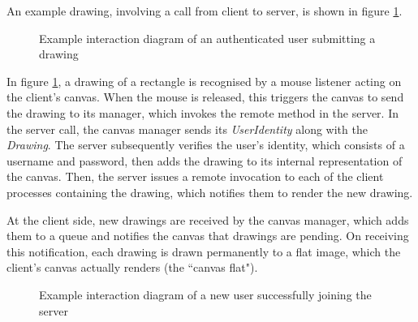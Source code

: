 \documentclass[12pt,a4paper]{article}
\begin{document}
An example drawing, involving a call from client to server, is shown in figure \ref{fig:draw}.

\begin{figure}[h]
\caption{Example interaction diagram of an authenticated user submitting a drawing}
\label{fig:draw}
\centering
\end{figure}

In figure \ref{fig:draw}, a drawing of a rectangle is recognised by a mouse listener acting on the client's canvas. When the mouse is released, this triggers the canvas to send the drawing to its manager, which invokes the remote method in the server. In the server call, the canvas manager sends its \textit{UserIdentity} along with the \textit{Drawing}. The server subsequently verifies the user's identity, which consists of a username and password, then adds the drawing to its internal representation of the canvas. Then, the server issues a remote invocation to each of the client processes containing the drawing, which notifies them to render the new drawing.

At the client side, new drawings are received by the canvas manager, which adds them to a queue and notifies the canvas that drawings are pending. On receiving this notification, each drawing is drawn permanently to a flat image, which the client's canvas actually renders (the ``canvas flat"). 

\begin{figure}[h]
\caption{Example interaction diagram of a new user successfully joining the server}
\label{fig:join}
\centering
\end{figure}
\end{document}
